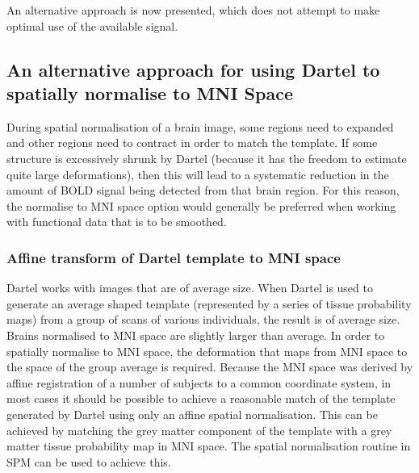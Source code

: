 An alternative approach is now presented, which does not attempt to make optimal use of the available signal.

\subsection{An alternative approach for using Dartel to spatially normalise to MNI Space}
During spatial normalisation of a brain image, some regions need to expanded and other regions need to contract in order to match the template.
If some structure is excessively shrunk by Dartel (because it has the freedom to estimate quite large deformations), then this will lead to a systematic reduction in the amount of BOLD signal being detected from that brain region.
For this reason, the normalise to MNI space option would generally be preferred when working with functional data that is to be smoothed.

\subsubsection{Affine transform of Dartel template to MNI space}
Dartel works with images that are of average size.
When Dartel is used to generate an average shaped template (represented by a series of tissue probability maps) from a group of scans of various individuals, the result is of average size.
Brains normalised to MNI space are slightly larger  than average.
In order to spatially normalise to MNI space, the deformation that maps from MNI space to the space of the group average is required.
Because the MNI space was derived by affine registration of a number of subjects to a common coordinate system, in most cases it should be possible to achieve a reasonable match of the template generated by Dartel using only an affine spatial normalisation.
This can be achieved by matching the grey matter component of the template with a grey matter tissue probability map in MNI space.
The spatial normalisation routine in SPM can be used to achieve this.

